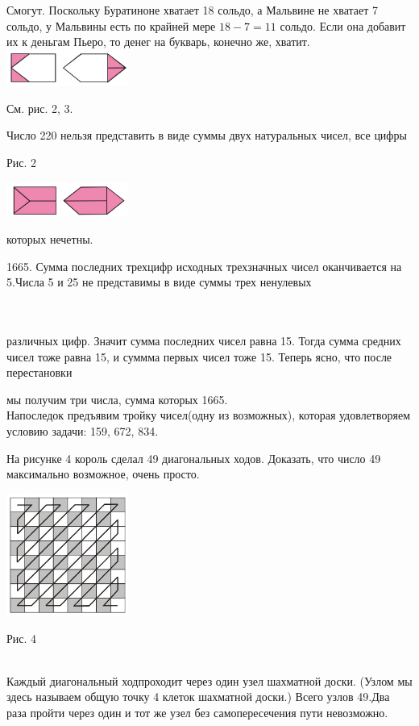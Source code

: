 \begin{enumerate}[itemsep = -3pt, itemindent = -7pt, labelsep = 5pt, font = \bfseries, topsep = 3pt, wide]
\item Смогут. Поскольку Буратиноне хватает 18 сольдо, а Мальвине не хватает 7 сольдо, у Мальвины есть по крайней мере $18 - 7 = 11$  сольдо. Если она добавит их к деньгам Пьеро, то денег на букварь, конечно же, хватит.
\includegraphics[width=0.3\textwidth]{Ромбики1jpg.jpg}%
\parbox[b]{0.185\textwidth}{\item \smallskip См. рис. 2, 3.\item Число 220 нельзя представить в виде суммы двух натуральных чисел, все цифры}
\vspace{-12pt}
\begin{flushleft}
 \quad Рис. 2
\end{flushleft}
\vspace{-10pt}
\includegraphics[width=0.3\textwidth]{Ромбики2jpg.jpg}%
\parbox[b]{0.185\textwidth}{которых нечетны.\vspace{1mm}\item 1665. Сумма последних трехцифр исходных трехзначных чисел оканчивается на 5.Числа 5 и 25 не представимы в виде суммы трех ненулевых}
\vspace{-10pt}
\\ \\
различных цифр. Значит сумма последних чисел равна 15. Тогда сумма средних чисел тоже равна 15, и суммма первых чисел тоже 15. Теперь ясно, что после перестановки \\ \parbox[b]{0.185\textwidth}{ мы получим три числа, сумма которых 1665. \\ Напоследок предъявим тройку чисел(одну из возможных), которая удовлетворяем условию задачи: 159, 672, 834. \item  На рисунке 4 король сделал 49 диагональных ходов. Доказать, что число 49 максимально возможное, очень просто.}
\includegraphics[width=0.3\textwidth]{Доска.jpg} 
\vspace{-0.8cm}
\begin{center}
    Рис. 4
\end{center} \\
\vspace{-0.45cm}
Каждый диагональный ходпроходит через один узел шахматной доски. (Узлом мы здесь называем общую точку 4 клеток шахматной доски.) Всего узлов 49.Два раза пройти через один и тот же узел без самопересечения пути невозможно.
\end{enumerate}
